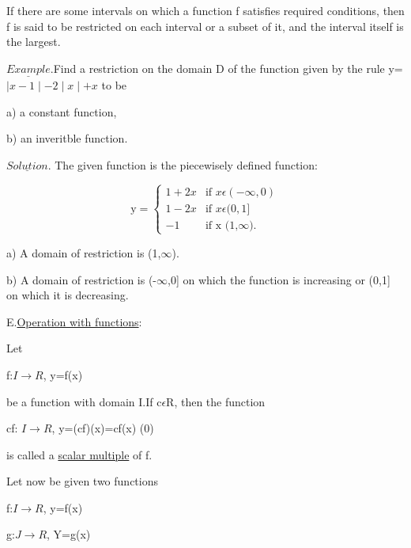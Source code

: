 \documentclass[11pt]{amsbook}
\begin{document}
    If there are some intervals on which a function f satisfies required conditions, then  f is  said to be restricted on each
    interval or a subset of it, and the interval itself is the largest.\\


    $\underline{Example}$.Find a restriction on the domain D of the function given by the rule y= $\mid x-1 \mid -2 \mid x \mid + x$
    to be

     a) a constant function,

     b) an inveritble  function.

    $\underline{Solution}$. The given function is the piecewisely defined function:


\begin{center}
   $$
\mbox{y}=\left\{
\begin{array}{rl}
1 + 2x & \mbox{if $x \epsilon (-\infty,0)$} \\
1 - 2x & \mbox{if $x \epsilon (0,1]$} \\
-1 & \mbox{if x (1,$\infty$).}
\end{array} \right.
$$
\end{center}


    a) A domain of restriction is (1,$\infty$).

    b) A domain of restriction is (-$\infty$,0] on which the function is increasing or (0,1] on which it is decreasing.

    E.\underline{Operation with functions}:

    Let

    \begin{center}
    f:$I\rightarrow R$, y=f(x)
    \end{center}


be a function with domain I.If c$\epsilon$R, then the function

    \begin{center}
    cf: $I \rightarrow R$, y=(cf)(x)=cf(x)   (0)
    \end{center}


is called a \underline{scalar multiple} of f.

    Let now be given two functions

\begin{center}

    f:$I\rightarrow R$, y=f(x)

    g:$J\rightarrow R$, Y=g(x)
\end{center}
\end{document}
